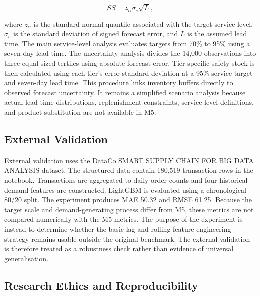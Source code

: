 \begin{equation}
SS=z_{\alpha}\sigma_e\sqrt{L},
\label{eq:safety}
\end{equation}

where $z_{\alpha}$ is the standard-normal quantile associated with the target service level, $\sigma_e$ is the standard deviation of signed forecast error, and $L$ is the assumed lead time.
The main service-level analysis evaluates targets from 70\% to 95\% using a seven-day lead time.
The uncertainty analysis divides the 14,000 observations into three equal-sized tertiles using absolute forecast error.
Tier-specific safety stock is then calculated using each tier's error standard deviation at a 95\% service target and seven-day lead time.
This procedure links inventory buffers directly to observed forecast uncertainty.
It remains a simplified scenario analysis because actual lead-time distributions, replenishment constraints, service-level definitions, and product substitution are not available in M5.

\subsection{External Validation}

External validation uses the DataCo SMART SUPPLY CHAIN FOR BIG DATA ANALYSIS dataset.
The structured data contain 180,519 transaction rows in the notebook.
Transactions are aggregated to daily order counts and four historical-demand features are constructed.
LightGBM is evaluated using a chronological 80/20 split.
The experiment produces MAE 50.32 and RMSE 61.25.
Because the target scale and demand-generating process differ from M5, these metrics are not compared numerically with the M5 metrics.
The purpose of the experiment is instead to determine whether the basic lag and rolling feature-engineering strategy remains usable outside the original benchmark.
The external validation is therefore treated as a robustness check rather than evidence of universal generalisation.

\subsection{Research Ethics and Reproducibility}

